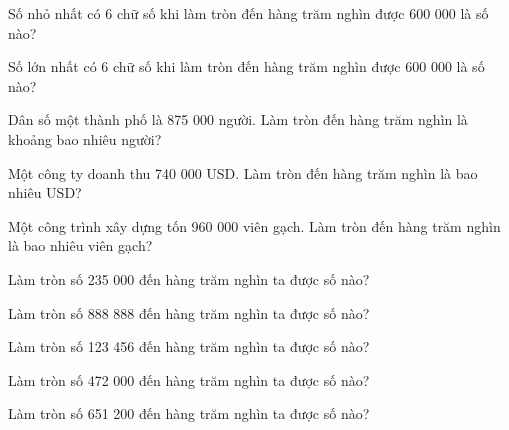\begin{ex}
Số nhỏ nhất có 6 chữ số khi làm tròn đến hàng trăm nghìn được 600 000 là số nào?
\end{ex}

\begin{ex}
Số lớn nhất có 6 chữ số khi làm tròn đến hàng trăm nghìn được 600 000 là số nào?
\end{ex}

\begin{ex}
Dân số một thành phố là 875 000 người. Làm tròn đến hàng trăm nghìn là khoảng bao nhiêu người?
\end{ex}

\begin{ex}
Một công ty doanh thu 740 000 USD. Làm tròn đến hàng trăm nghìn là bao nhiêu USD?
\end{ex}

\begin{ex}
Một công trình xây dựng tốn 960 000 viên gạch. Làm tròn đến hàng trăm nghìn là bao nhiêu viên gạch?
\end{ex}

\begin{ex}
Làm tròn số 235 000 đến hàng trăm nghìn ta được số nào?
\end{ex}

\begin{ex}
Làm tròn số 888 888 đến hàng trăm nghìn ta được số nào?
\end{ex}

\begin{ex}
Làm tròn số 123 456 đến hàng trăm nghìn ta được số nào?
\end{ex}

\begin{ex}
Làm tròn số 472 000 đến hàng trăm nghìn ta được số nào?
\end{ex}

\begin{ex}
Làm tròn số 651 200 đến hàng trăm nghìn ta được số nào?
\end{ex}

